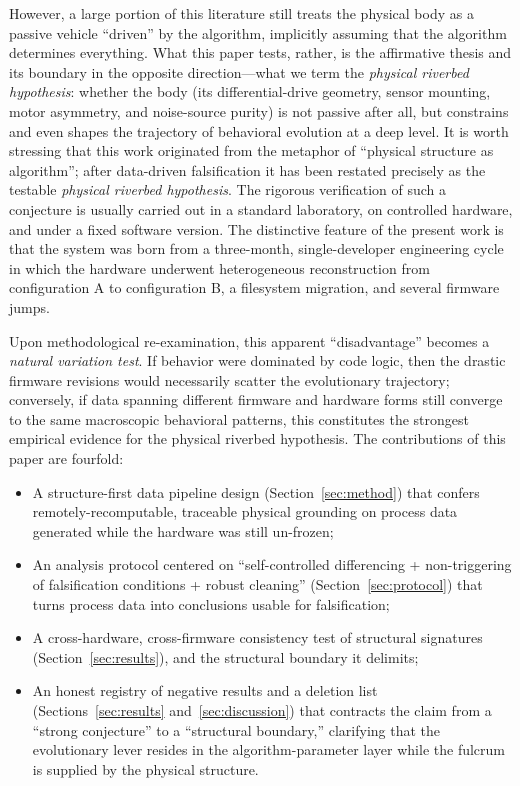 \documentclass[11pt]{article}
\begin{document}
However, a large portion of this literature still treats the physical body as a passive vehicle ``driven'' by the algorithm, implicitly assuming that the algorithm determines everything. What this paper tests, rather, is the affirmative thesis and its boundary in the opposite direction---what we term the \emph{physical riverbed hypothesis}: whether the body (its differential-drive geometry, sensor mounting, motor asymmetry, and noise-source purity) is not passive after all, but constrains and even shapes the trajectory of behavioral evolution at a deep level. It is worth stressing that this work originated from the metaphor of ``physical structure as algorithm''; after data-driven falsification it has been restated precisely as the testable \emph{physical riverbed hypothesis}. The rigorous verification of such a conjecture is usually carried out in a standard laboratory, on controlled hardware, and under a fixed software version. The distinctive feature of the present work is that the system was born from a three-month, single-developer engineering cycle in which the hardware underwent heterogeneous reconstruction from configuration A to configuration B, a filesystem migration, and several firmware jumps.

Upon methodological re-examination, this apparent ``disadvantage'' becomes a \emph{natural variation test}. If behavior were dominated by code logic, then the drastic firmware revisions would necessarily scatter the evolutionary trajectory; conversely, if data spanning different firmware and hardware forms still converge to the same macroscopic behavioral patterns, this constitutes the strongest empirical evidence for the physical riverbed hypothesis. The contributions of this paper are fourfold:

\begin{itemize}
  \item A structure-first data pipeline design (Section~\ref{sec:method}) that confers remotely-recomputable, traceable physical grounding on process data generated while the hardware was still un-frozen;
  \item An analysis protocol centered on ``self-controlled differencing + non-triggering of falsification conditions + robust cleaning'' (Section~\ref{sec:protocol}) that turns process data into conclusions usable for falsification;
  \item A cross-hardware, cross-firmware consistency test of structural signatures (Section~\ref{sec:results}), and the structural boundary it delimits;
  \item An honest registry of negative results and a deletion list (Sections~\ref{sec:results} and~\ref{sec:discussion}) that contracts the claim from a ``strong conjecture'' to a ``structural boundary,'' clarifying that the evolutionary lever resides in the algorithm-parameter layer while the fulcrum is supplied by the physical structure.
\end{itemize}
\end{document}
